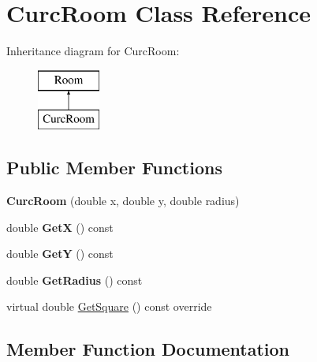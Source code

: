 \hypertarget{class_curc_room}{}\section{Curc\+Room Class Reference}
\label{class_curc_room}
Inheritance diagram for Curc\+Room\+:\begin{figure}[H]
\begin{center}
\leavevmode
\includegraphics[height=2.000000cm]{class_curc_room}
\end{center}
\end{figure}
\subsection*{Public Member Functions}
\begin{DoxyCompactItemize}
\item 
\mbox{\label{class_curc_room_a768566b7c9eebf909990302525836f0e}} 
{\bfseries Curc\+Room} (double x, double y, double radius)
\item 
\mbox{\label{class_curc_room_a83b8ca5d1147018a4acbd1db8d66cff3}} 
double {\bfseries GetX} () const
\item 
\mbox{\label{class_curc_room_ac5062f9fc34fd29fd7c3548ec4cede51}} 
double {\bfseries GetY} () const
\item 
\mbox{\label{class_curc_room_a63e10278169feffef1ecba77cb66a7be}} 
double {\bfseries Get\+Radius} () const
\item 
virtual double \mbox{\hyperlink{class_curc_room_a0026b4be5fc20d3d1e701d4c5acdf994}{Get\+Square}} () const override
\end{DoxyCompactItemize}


\subsection{Member Function Documentation}
\mbox{\label{class_curc_room_a0026b4be5fc20d3d1e701d4c5acdf994}} 
